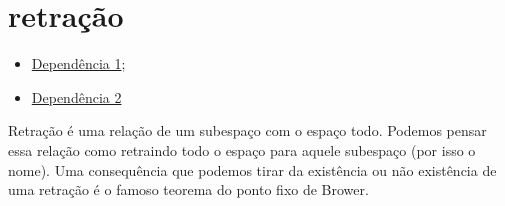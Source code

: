 \section{retração}
\label{retração}

\begin{itemize}{Lista de Dependências}
    \item \hyperref[homotopia]{Dependência 1};\\ %
    \item \hyperref[grupo-fundamental]{Dependência 2}
\end{itemize}

Retração é uma relação de um subespaço com o espaço todo. Podemos pensar essa relação como retraindo todo o espaço para aquele subespaço (por isso o nome). Uma consequência que podemos tirar da existência ou não existência de uma retração é o famoso teorema do ponto fixo de Brower. 




